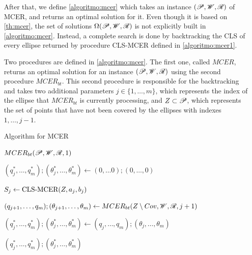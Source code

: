 After that, we define \autoref{algoritmo:mcer} which takes an instance $(\mathscr{P}, \mathscr{W}, \mathscr{R})$ of MCER, and returns an optimal solution for it.
Even though it is based on \autoref{th:mcer}, the set of solutions $\Omega(\mathscr{P}, \mathscr{W}, \mathscr{R})$ is not explicitly built in \autoref{algoritmo:mcer}. Instead, a complete search is done by backtracking the CLS of every ellipse returned by procedure CLS-MCER defined in \autoref{algoritmo:mcer1}.

Two procedures are defined in \autoref{algoritmo:mcer}. The first one, called $MCER$, returns an optimal solution for an instance $(\mathscr{P}, \mathscr{W}, \mathscr{R})$ using the second procedure $MCER_{bt}$. This second procedure is responsible for the backtracking and takes two additional parameters $j\in\{1, \dots, m\}$, which represents the index of the ellipse that $MCER_{bt}$ is currently processing, and $Z\subset \mathscr{P}$, which represents the set of points that have not been covered by the ellipses with indexes $1, \dots, j-1$.


\begin{algoritmo}
	\caption{Algorithm for MCER}\label{algoritmo:mcer}
	\begin{algorithmic}[1]
		
		
		\item[]
		\State \Return $MCER_{bt}(\mathscr{P}, \mathscr{W}, \mathscr{R}, 1)$
		\EndProcedure
		
		\item[]
		
		
		\State $(q_{j}^*, \dots, q_m^*); (\theta_{j}^*, \dots, \theta_m^*) \gets (0, \dots 0); (0, \dots, 0)$ 
		
		\State $S_j \gets \textnormal{CLS-MCER}(Z, a_j, b_j)$

		
		
		\State $(q_{j+1}, \dots, q_m); (\theta_{j+1}, \dots, \theta_m) \gets  MCER_{bt}(Z\setminus Cov, \mathscr{W}, \mathscr{R}, j+1)$
		\EndIf
		
			
			\State $(q_{j}^*, \dots, q_m^*); (\theta_{j}^*, \dots, \theta_m^*) \gets (q_{j}, \dots, q_m); (\theta_{j}, \dots, \theta_m)$
		\EndIf
		\EndFor
		
		\State \Return $(q_{j}^*, \dots, q_m^*); (\theta_{j}^*, \dots, \theta_m^*)$
		\EndProcedure
	\end{algorithmic}
\end{algoritmo}

